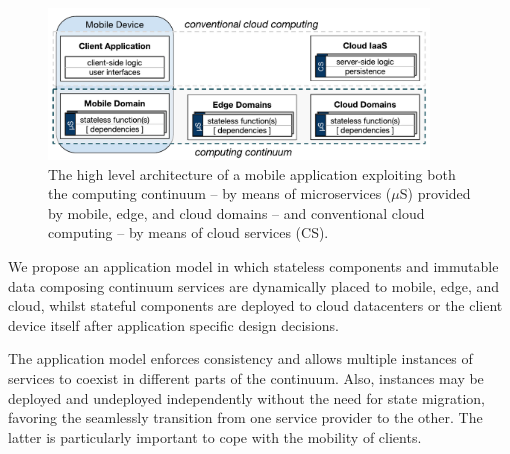 \begin{figure}[tbp]
	\includegraphics[width=0.9\textwidth]{figs/Continuum-arch}
	\caption{The high level architecture of a mobile application exploiting both the computing continuum -- by means of microservices ($\mu$S) provided by mobile, edge, and cloud domains -- and conventional cloud computing -- by means of cloud services (CS).}
	\label{fig:Continuum-arch}
\end{figure}



We propose an application model in which stateless components and immutable data composing continuum services are dynamically placed to mobile, edge, and cloud,
whilst 
stateful components are deployed to cloud datacenters or the client device itself after application specific design decisions.

The application model enforces consistency and allows multiple instances of services to coexist in different parts of the continuum. Also, instances may be deployed and undeployed independently without the need for state migration, favoring the seamlessly transition from one service provider to the other. The latter is particularly important to cope with the mobility of clients.

